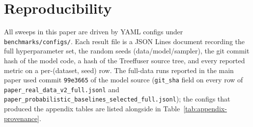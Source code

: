 \documentclass{uai2026}
\begin{document}
\section{Reproducibility}\label{app:repro}

All sweeps in this paper are driven by YAML configs under \texttt{benchmarks/configs/}. Each result file is a JSON Lines document recording the full hyperparameter set, the random seeds (data/model/sampler), the git commit hash of the model code, a hash of the Treeffuser source tree, and every reported metric on a per-(dataset, seed) row. The full-data runs reported in the main paper used commit \texttt{99e3665} of the model source (\texttt{git\_sha} field on every row of \texttt{paper\_real\_data\_v2\_full.jsonl} and \texttt{paper\_probabilistic\_baselines\_selected\_full.jsonl}); the configs that produced the appendix tables are listed alongside in Table~\ref{tab:appendix-provenance}.
\end{document}
